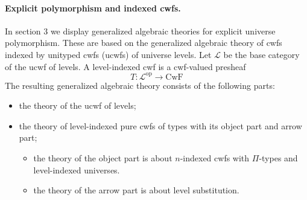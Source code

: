\documentclass[11pt,a4paper]{article}
\theoremstyle{definition}
\newcommand{\op}{\mathrm{op}}
\def\L{{\mathcal{L}}}
\def\CwF{\mathrm{CwF}}
\begin{document}
\paragraph{Explicit polymorphism and indexed cwfs.} In section 3 we display generalized algebraic theories for explicit universe polymorphism. These are based on the generalized algebraic theory of cwfs indexed by unityped cwfs (ucwfs) of universe levels. Let $\L$ be the base category of the ucwf of levels. A level-indexed cwf is a cwf-valued presheaf 
$$
T : \L^\op \to \CwF
$$
The resulting generalized algebraic theory consists of the following parts: \begin{itemize}
\item the theory of the ucwf of levels;
\item the theory of level-indexed pure cwfs of types with its object part and
arrow part;
\begin{itemize}
\item the theory of the object part is about $n$-indexed cwfs with $\Pi$-types and level-indexed universes.
\item the theory of the arrow part is about level substitution.
\end{itemize}
\end{itemize}
\end{document}
